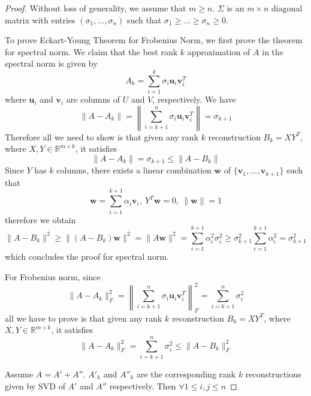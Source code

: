 \documentclass[../book-template.tex]{subfiles}
\begin{document}
\begin{proof}
Without loss of generality, we assume that $m\geq n$. $\Sigma$ is an $m\times n$ diagonal matrix with entries $(\sigma_1,\dots,\sigma_n)$ such that $\sigma_1\geq\dots\geq \sigma_n\geq 0$.
\par To prove Eckart-Young Theorem for Frobenius Norm, we first prove the theorem for spectral norm. We claim that the best rank $k$ approximation of $A$ in the spectral norm is given by
\begin{equation*}
    A_k = \sum_{i=1}^{k}\sigma_i\bm{u}_i\bm{v}^T_i
\end{equation*}
where $\bm{u}_i$ and $\bm{v}_i$ are columns of $U$ and $V$, respectively. We have
\begin{equation*}
    \|A-A_k\| = \left\|\sum_{i=k+1}^{n}\sigma_i\bm{u}_i\bm{v}^T_i\right\| = \sigma_{k+1}
\end{equation*}
Therefore all we need to show is that given any rank $k$ reconstruction $B_k=XY^T$, where $X,Y\in \mathbb{R}^{m\times k}$, it satisfies
\begin{equation*}
     \|A-A_k\| =\sigma_{k+1}\leq \|A-B_k\|
\end{equation*}
Since $Y$ has $k$ columns, there exists a linear combination $\bm{w}$ of $\{\bm{v}_1,\dots,\bm{v}_{k+1}\}$ such that
\begin{equation*}
    \bm{w} = \sum_{i=1}^{k+1}\alpha_i\bm{v}_i,\ Y^T\bm{w}=0,\ \|\bm{w}\|=1
\end{equation*}
therefore we obtain
\begin{equation*}
    \|A-B_k\|^2\geq \|(A-B_k)\bm{w}\|^2 = \|A\bm{w}\|^2 = \sum_{i=1}^{k+1}\alpha_i^2\sigma_i^2\geq \sigma_{k+1}^2\sum_{i=1}^{k+1}\alpha_i^2 = \sigma_{k+1}^2
\end{equation*}
which concludes the proof for spectral norm.
\par For Frobenius norm, since
\begin{equation*}
    \|A-A_k\|_F^2= \left\|\sum_{i=k+1}^{n}\sigma_i\bm{u}_i\bm{v}^T_i\right\|_F^2 = \sum_{i=k+1}^{n}\sigma_i^2
\end{equation*}
all we have to prove is that given any rank $k$ reconstruction $B_k=XY^T$, where $X,Y\in \mathbb{R}^{m\times k}$, it satisfies
\begin{equation*}
     \|A-A_k\|_F^2 =\sum_{i=k+1}^{n}\sigma_i^2\leq \|A-B_k\|_F^2
\end{equation*}
\par Assume $A=A'+A''$. $A'_k$ and $A''_k$ are the corresponding rank $k$ reconstructions given by SVD of $A'$ and $A''$ respectively. Then $\forall 1\leq i,j\leq n$

\end{proof}
\end{document}
